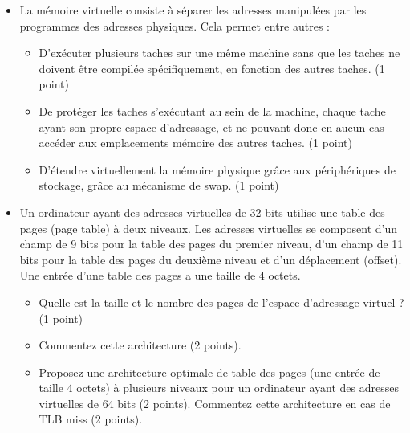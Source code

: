 \begin{correction}

\begin{itemize}
  \item La m\'emoire virtuelle consiste \`a s\'eparer les adresses manipul\'ees par les programmes des adresses physiques. Cela permet entre autres :
  \begin{itemize}
    \item D'ex\'ecuter plusieurs taches  sur une même machine sans que les taches ne doivent être compil\'ee sp\'ecifiquement, en fonction des autres taches. (1 point)
    \item De prot\'eger les taches s'ex\'ecutant au sein de la machine, chaque tache ayant son propre espace d'adressage, et ne pouvant donc en aucun cas acc\'eder aux emplacements m\'emoire des autres taches. (1 point)
    \item D'\'etendre virtuellement la m\'emoire physique gr\^ace aux p\'eriph\'eriques de stockage, gr\^ace au m\'ecanisme de swap. (1 point)
  \end{itemize}
\end{itemize}

\end{correction}

\begin{itemize}
  \item Un ordinateur ayant des adresses virtuelles de 32 bits utilise une table des pages (page table) \`a deux niveaux. Les adresses virtuelles se composent d'un champ de 9 bits pour la table des pages du premier niveau, d'un champ de 11 bits pour la table des pages du deuxi\`eme niveau et d'un d\'eplacement (offset). Une entr\'ee d'une table des pages a une taille de 4 octets.
  \begin{itemize}
  \item Quelle est la taille et le nombre des pages de l'espace d'adressage virtuel ? (1 point)
  \item Commentez cette architecture (2 points).
  \item Proposez une architecture optimale de table des pages (une entr\'ee de taille 4 octets) \`a plusieurs niveaux pour un ordinateur ayant des adresses virtuelles de 64 bits (2 points). Commentez cette architecture en cas de TLB miss (2 points).
  \end{itemize}
\end{itemize}

